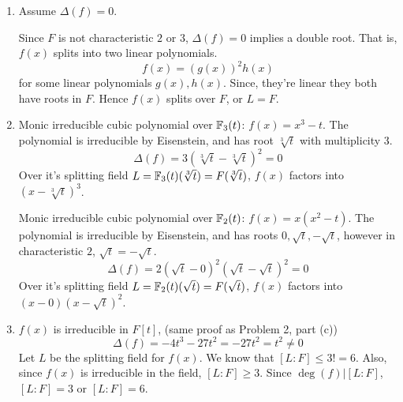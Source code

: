 \documentclass[12pt]{article}
\begin{document}
\begin{solution}
\begin{enumerate}
\begin{enumerate}
        \bbni

        $(\impliedby)$ Assume $[L:F] = 3$. 

        If $[L:F] = 3$, then $L = F(\alpha)$ since $\alpha$ is the root to an irreducible cubic and hence generates a degree three extension. From part (a) we know that $L = F(\alpha, \sqrt{\Delta(f)})$. Since $F(\alpha, \sqrt{\Delta(f)}) = F(\alpha)$, $\sqrt{\Delta(f)}$ must be in $F$. Hence, $\Delta(f)$ is a square in $F$. 

        \bbni

        \item $f(x)$ is reducible over $F$.  
        
        If $f(x)$ is reducible over $F$ it either splits into $3$ linear polynomials, or $1$ linear and $1$ quadratic polynomial. That is, there exists some root $\alpha$ of $f(x) \in F$. Then, $L = F(\alpha, \sqrt{\Delta(f)}) = F(\sqrt{\Delta(f)})$. 
       \end{enumerate}

       \item Assume $\Delta(f) = 0$. 
       
       Since $F$ is not characteristic $2$ or $3$, $\Delta(f) = 0$ implies a double root. That is, $f(x)$ splits into two linear polynomials. 
       \[f(x) = (g(x))^2h(x)\] 
       for some linear polynomials $g(x), h(x)$. Since, they're linear they both have roots in $F$. Hence $f(x)$ splits over $F$, or $L = F$. 

       \item Monic irreducible cubic polynomial over $\mathbb F_3(t)$: $f(x) = x^3 - t$. The polynomial is irreducible by Eisenstein, and has root $\sqrt[3]{t}$ with multiplicity 3. 
       \[\Delta(f)=3(\sqrt[3]{t} - \sqrt[3]{t} )^2 = 0\]
       Over it's splitting field $L = \mathbb F_3(t)(\sqrt[3]{t}) =F(\sqrt[3]{t})$, $f(x)$ factors into $(x-\sqrt[3]{t})^3$.

       Monic irreducible cubic polynomial over $\mathbb F_2(t)$: $f(x) = x(x^2 - t)$. The polynomial is irreducible by Eisenstein, and has roots $0, \sqrt{t}, -\sqrt{t}$, however in characteristic $2$, $\sqrt{t} = -\sqrt{t}$. 
       \[\Delta(f)=2(\sqrt{t} - 0)^2 (\sqrt{t} - \sqrt{t})^2 = 0\]
       Over it's splitting field $L = \mathbb F_2(t)(\sqrt{t}) =F(\sqrt{t})$, $f(x)$ factors into $(x-0)(x-\sqrt{t})^2$.

       \item  $f(x)$ is irreducible in $F[t]$, (same proof as Problem 2, part (c))
        \[\Delta(f) = -4t^3 - 27t^2 = -27 t^2 = t^2 \neq 0\]
        Let $L$ be the splitting field for $f(x)$. We know that $[L:F] \leq 3! = 6$. Also, since $f(x)$ is irreducible in the field, $[L:F] \geq 3$. Since $\deg(f) \big | [L:F]$, $[L:F] =3$ or $[L:F] = 6$. 
        

\end{enumerate}
\end{solution}
\end{document}
